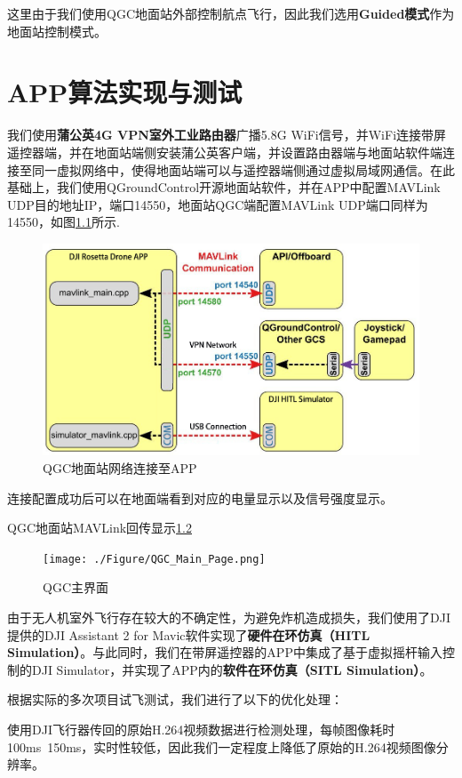 这里由于我们使用QGC地面站外部控制航点飞行，因此我们选用\textbf{Guided模式}作为地面站控制模式。

\chapter{APP算法实现与测试}

我们使用\textbf{蒲公英4G VPN室外工业路由器}广播5.8G WiFi信号，并WiFi连接带屏遥控器端，并在地面站端侧安装蒲公英客户端，并设置路由器端与地面站软件端连接至同一虚拟网络中，使得地面站端可以与遥控器端侧通过虚拟局域网通信。在此基础上，我们使用QGroundControl开源地面站软件，并在APP中配置MAVLink UDP目的地址IP，端口14550，地面站QGC端配置MAVLink UDP端口同样为14550，如图\ref{Fig:img13}所示.

\begin{figure}[ht]
  \centering
  \includegraphics[width=0.8\linewidth]{./Figure/QGC_Connect_to_APP.png}
  \caption{QGC地面站网络连接至APP}\label{Fig:img13}
\end{figure}

连接配置成功后可以在地面端看到对应的电量显示以及信号强度显示。

QGC地面站MAVLink回传显示\ref{Fig:img15}

\begin{figure}[ht]
  \centering
  \texttt{[image: ./Figure/QGC\_Main\_Page.png]}
  \caption{QGC主界面}\label{Fig:img15}
\end{figure}

由于无人机室外飞行存在较大的不确定性，为避免炸机造成损失，我们使用了DJI提供的DJI Assistant 2 for Mavic软件实现了\textbf{硬件在环仿真（HITL Simulation）}。与此同时，我们在带屏遥控器的APP中集成了基于虚拟摇杆输入控制的DJI Simulator，并实现了APP内的\textbf{软件在环仿真（SITL Simulation）}。

根据实际的多次项目试飞测试，我们进行了以下的优化处理：

使用DJI飞行器传回的原始H.264视频数据进行检测处理，每帧图像耗时100ms~150ms，实时性较低，因此我们一定程度上降低了原始的H.264视频图像分辨率。

